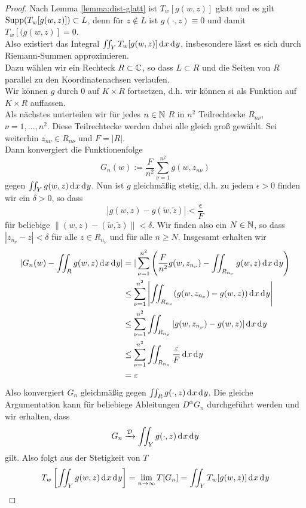 \begin{proof}
  Nach Lemma \ref{lemma:dist-glatt} ist $T_w[g(w,z)]$ glatt und es
  gilt $\operatorname{Supp}(T_w[g(w,z)]) \subset L$, denn für $z \notin L$ ist
  $g(\cdot, z) \equiv 0$ und damit $T_w[(g(w,z)] = 0$. \\
  Also existiert das Integral $\iint_Y T_w[g(w,z)] \d[x]\d[y]$,
  insbesondere lässt es sich durch Riemann-Summen approximieren. \\
  Dazu wählen wir ein Rechteck $R \subset \mathbb{C}$, so dass $L \subset R$
  und die Seiten von $R$ parallel zu den Koordinatenachsen
  verlaufen. \\
  Wir können $g$ durch 0 auf $K \times R$ fortsetzen, d.h. wir können
  si als Funktion auf $K \times R$ auffassen. \\
  Als nächstes unterteilen wir für jedes $n \in \mathbb{N}$ $R$ in $n^2$
  Teilrechtecke $R_{n\nu}$, $\nu = 1, \dots, n^2$. Diese Teilrechtecke
  werden dabei alle gleich groß gewählt. Sei weiterhin $z_{n\nu}
  \in R_{n \nu}$ und $F = |R|$. \\
  Dann konvergiert die Funktionenfolge
  \[
  G_n(w) := \frac{F}{n^2} \sum_{\nu=1}^{n^2} g(w, z_{n\nu})
  \]
  gegen $\iint_Y g(w,z) \d[x]\d[y]$. Nun ist $g$ gleichmäßig stetig,
  d.h. zu jedem $\epsilon > 0$ finden wir ein $\delta >0$, so dass
  \[
  | g(w,z) - g(\tilde w, \tilde z) | < \frac{\epsilon}{F}
  \]
  für beliebige $\| (w,z) - (\tilde w, \tilde z) \| < \delta$. Wir
  finden also ein $N \in \mathbb{N}$, so dass $|z_{n_\nu} - z| < \delta$ für
  alle $z \in R_{n_\nu}$ und für alle $n \geq N$. Insgesamt erhalten
  wir
  \begin{align*}
    |G_n(w) - \iint_R g(w,z) \d[x]\d[y]| & = | \sum_{\nu = 1}^{n^2}
    \left ( \frac{F}{n^2} g(w, z_{n_\nu}) - \iint_{R_{n_\nu}} g(w,z)
      \d[x]\d[y] \right ) \\
    & \leq \sum_{\nu=1}^{n^2} \left | \iint_{R_{n_\nu}}
      (g(w,z_{n_\nu}) - g(w,z)) \d[x]\d[y] \right | \\
    & \leq \sum_{\nu=1}^{n^2} \iint_{R_{n_\nu}} |g(w, z_{n_\nu}) -
    g(w,z)| \d[x]\d[y] \\
    & \leq \sum_{\nu=1}^{n^2} \iint_{R_{n_\nu}} \frac{\epsilon}{F}
    \d[x] \d[y] \\
    & = \epsilon
  \end{align*}
  Also konvergiert $G_n$ gleichmäßig gegen $\iint_R g(\cdot, z)
  \d[x]\d[y]$. Die gleiche Argumentation kann für beliebiege
  Ableitungen $D^\alpha G_n$ durchgeführt werden und wir erhalten,
  dass
  \[
  G_n \xrightarrow{\dist} \iint_Y g(\cdot, z) \d[x]\d[y]
  \]
  gilt. Also folgt aus der Stetigkeit von $T$
  \[
  T_w \left [ \iint_Y g(w, z) \d[x]\d[y] \right ] = \lim_{n \ra
    \infty} T[G_n] = \iint_Y T_w[g(w,z)] \d[x]\d[y]
  \]
\end{proof}

